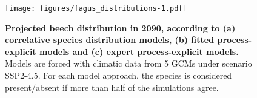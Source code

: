 \documentclass[letterpaper,8pt]{extarticle}  %
\begin{document}
\begin{doublespacing}
\begin{linenumbers}
\begin{figure}
\hspace*{-1.2cm}
\centering
\begin{subcaptiongroup}
\label{fig:fagusA} 
\label{fig:fagusB}
\label{fig:fagusC}
\end{subcaptiongroup}
\texttt{[image: figures/fagus\_distributions-1.pdf]}
\caption{\textbf{Projected beech distribution in 2090, according to (a) correlative species distribution models, (b) fitted process-explicit models and (c) expert process-explicit models.} Models are forced with climatic data from 5 GCMs under scenario SSP2-4.5. For each model approach, the species is considered present/absent if more than half of the simulations agree.}
\label{fig:fagus}
\end{figure}





\end{linenumbers}
\end{doublespacing}
\end{document}
